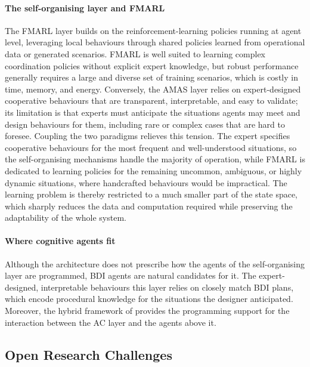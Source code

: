 \paragraph{The self-organising layer and \acs{FMARL}}
The \ac{FMARL} layer
builds on the reinforcement-learning policies running at agent level,
leveraging local behaviours through
shared policies learned from operational data or generated scenarios.
%
\ac{FMARL}
is well suited to learning complex coordination policies
without explicit expert knowledge,
but
robust performance generally requires a large and diverse set of training scenarios,
which is
costly in time, memory, and energy.
%
Conversely,
the \ac{AMAS} layer relies on expert-designed cooperative behaviours
that
are transparent, interpretable, and easy to validate;
its limitation is that experts must anticipate the situations agents may meet
and
design behaviours for them, including rare or complex cases that are hard to foresee.
%
Coupling the two paradigms relieves this tension.
%
The expert specifies cooperative behaviours
for
the most frequent and well-understood situations,
so
the self-organising mechanisms handle the majority of operation,
while
\ac{FMARL} is dedicated to learning policies
for the remaining
uncommon, ambiguous, or highly dynamic situations,
where handcrafted behaviours would be impractical.
%
The learning problem is thereby restricted to a much smaller part of the state space,
which
sharply reduces the data and computation required
while
preserving the adaptability of the whole system.

\paragraph{Where cognitive agents fit}
Although the architecture does not prescribe how the agents of the self-organising layer are programmed,
\ac{BDI} agents are natural candidates for it.
%
The expert-designed, interpretable behaviours this layer relies on
closely match \ac{BDI} plans,
which encode procedural knowledge for the situations the designer anticipated.
%
Moreover, 
the hybrid framework of 
provides the programming support for the interaction between the \ac{AC} layer and the agents above it.

\subsection{Open Research Challenges}
\label{sec:perspectives-sissy-challenges}

